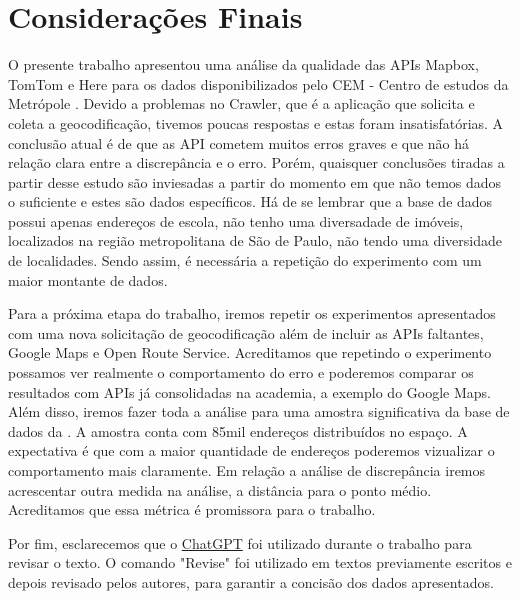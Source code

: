 \chapter{Considerações Finais} \label{consideracoes}

O presente trabalho apresentou uma análise da qualidade das APIs Mapbox, TomTom e Here para os dados disponibilizados pelo CEM - Centro de estudos da Metrópole \cite{cem}. Devido a problemas no Crawler, que é a aplicação que solicita e coleta a geocodificação, tivemos poucas respostas e estas foram insatisfatórias. A conclusão atual é de que as API cometem muitos erros graves e que não há relação clara entre a discrepância e o erro. 
Porém, quaisquer conclusões tiradas a partir desse estudo são inviesadas a partir do momento em que não temos dados o suficiente e estes são dados específicos. Há de se lembrar que a base de dados possui apenas endereços de escola, não tenho uma diversadade de imóveis, localizados na região metropolitana de São de Paulo, não tendo uma diversidade de localidades. 
Sendo assim, é necessária a repetição do experimento com um maior montante de dados. 

Para a próxima etapa do trabalho, iremos repetir os experimentos apresentados com uma nova solicitação de geocodificação além de incluir as APIs faltantes, Google Maps e Open Route Service. Acreditamos que repetindo o experimento possamos ver realmente o comportamento do erro e poderemos comparar os resultados com APIs já consolidadas na academia, a exemplo do Google Maps. Além disso, iremos fazer toda a análise para uma amostra significativa da base de dados da \cite{prodabel}. A amostra conta com 85mil endereços distribuídos no espaço. A expectativa é que com a maior quantidade de endereços poderemos vizualizar o comportamento mais claramente. 
Em relação a análise de discrepância iremos acrescentar outra medida na análise, a distância para o ponto médio. Acreditamos que essa métrica é promissora para o trabalho. 

Por fim, esclarecemos que o \href{https://chat.openai.com/auth/login?next=%2F}{ChatGPT} foi utilizado durante o trabalho para revisar o texto. O comando "Revise" foi utilizado em textos previamente escritos e depois revisado pelos autores, para garantir a concisão dos dados apresentados. 
 